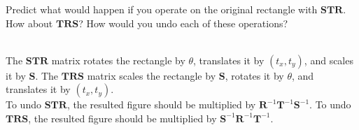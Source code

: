 Predict what would happen if you operate on the original rectangle with $\boldsymbol{STR}$. How about $\boldsymbol{TRS}$? How would you undo each of these operations?

\begin{solution}\ \\
    The $\boldsymbol{STR}$ matrix rotates the rectangle by $\theta$, translates it by $(t_x, t_y)$, and scales it by $\boldsymbol{S}$. The $\boldsymbol{TRS}$ matrix scales the rectangle by $\boldsymbol{S}$, rotates it by $\theta$, and translates it by $(t_x, t_y)$. \\
    
    To undo $\boldsymbol{STR}$, the resulted figure should be multiplied by $\boldsymbol{R}^{-1}\boldsymbol{T}^{-1}\boldsymbol{S}^{-1}$. To undo $\boldsymbol{TRS}$, the resulted figure should be multiplied by $\boldsymbol{S}^{-1}\boldsymbol{R}^{-1}\boldsymbol{T}^{-1}$.
\end{solution}